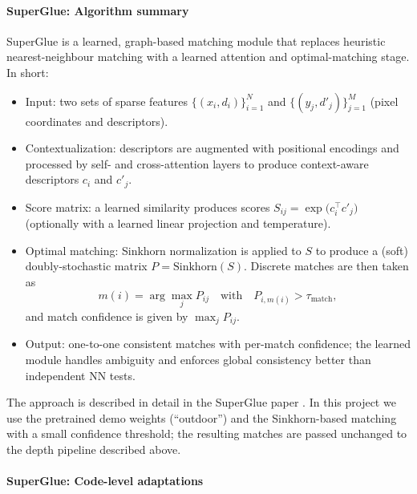 \documentclass{rapport}
\begin{document}
 \paragraph{SuperGlue: Algorithm summary}
SuperGlue is a learned, graph-based matching module that replaces heuristic nearest-neighbour matching with a learned attention and optimal-matching stage. In short:
\begin{itemize}
    \item Input: two sets of sparse features \(\{(x_i,d_i)\}_{i=1}^N\) and \(\{(y_j,d'_j)\}_{j=1}^M\) (pixel coordinates and descriptors).
    \item Contextualization: descriptors are augmented with positional encodings and processed by self- and cross-attention layers to produce context-aware 
    descriptors \(c_i\) and \(c'_j\).
    \item Score matrix: a learned similarity produces scores \(S_{ij} = \exp\big(c_i^\top c'_j\big)\) (optionally with a learned linear projection and 
    temperature).
    \item Optimal matching: Sinkhorn normalization is applied to \(S\) to produce a (soft) doubly-stochastic matrix \(P=\text{Sinkhorn}(S)\). Discrete 
    matches are then taken as
    \[
      m(i) = \arg\max_j P_{ij}\quad\text{with}\quad P_{i,m(i)} > \tau_{\text{match}},
    \]
    and match confidence is given by \(\max_j P_{ij}\).
    \item Output: one-to-one consistent matches with per-match confidence; the learned module handles ambiguity and enforces global consistency better 
    than independent NN tests.
\end{itemize}
The approach is described in detail in the SuperGlue paper \cite{sarlin20superglue}. In this project we use the pretrained demo weights (``outdoor'') 
and the Sinkhorn-based matching with a small confidence threshold; the resulting matches are passed unchanged to the depth pipeline described above.

 \paragraph{SuperGlue: Code-level adaptations}
\end{document}
